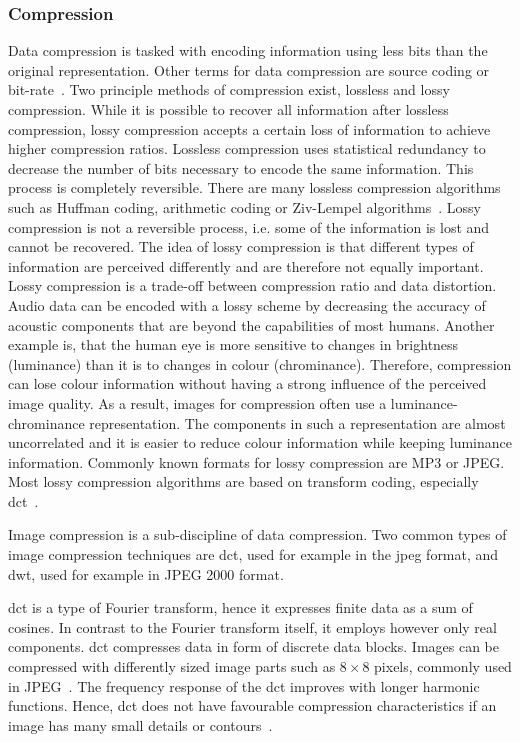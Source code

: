 \subsubsection{Compression} \label{sec:t_compress}
Data compression is tasked with encoding information using less bits than the original representation. Other terms for data compression are source coding or bit-rate~\cite{Mahdi2012ImplementingTechnique}. Two principle methods of compression exist, lossless and lossy compression. While it is possible to recover all information after lossless compression, lossy compression accepts a certain loss of information to achieve higher compression ratios.
Lossless compression uses statistical redundancy to decrease the number of bits necessary to encode the same information. This process is completely reversible. There are many lossless compression algorithms such as Huffman coding, arithmetic coding or Ziv-Lempel algorithms~\cite{Bocharova2009CompressionMultimedia}.
Lossy compression is not a reversible process, i.e. some of the information is lost and cannot be recovered. The idea of lossy compression is that different types of information are perceived differently and are therefore not equally important. Lossy compression is a trade-off between compression ratio and data distortion. Audio data can be encoded with a lossy scheme by decreasing the accuracy of acoustic components that are beyond the capabilities of most humans. Another example is, that the human eye is more sensitive to changes in brightness (luminance) than it is to changes in colour (chrominance). Therefore, compression can lose colour information without having a strong influence of the perceived image quality. As a result, images for compression often use a luminance-chrominance representation. The components in such a representation are almost uncorrelated and it is easier to reduce colour information while keeping luminance information. Commonly known formats for lossy compression are MP3 or JPEG. Most lossy compression algorithms are based on transform coding, especially \gls{dct}~\cite{Bocharova2009CompressionMultimedia}.

Image compression is a sub-discipline of data compression. Two common types of image compression techniques are \gls{dct}, used for example in the \gls{jpeg} format, and \gls{dwt}, used for example in JPEG 2000 format.

\Gls{dct} is a type of Fourier transform, hence it expresses finite data as a sum of cosines. In contrast to the Fourier transform itself, it employs however only real components. \Gls{dct} compresses data in form of discrete data blocks. Images can be compressed with differently sized image parts such as $8\times8$ pixels, commonly used in JPEG~\cite{Bocharova2009CompressionMultimedia}.
The frequency response of the \gls{dct} improves with longer harmonic functions. Hence, \gls{dct} does not have favourable compression characteristics if an image has many small details or contours~\cite{Bocharova2009CompressionMultimedia}.

